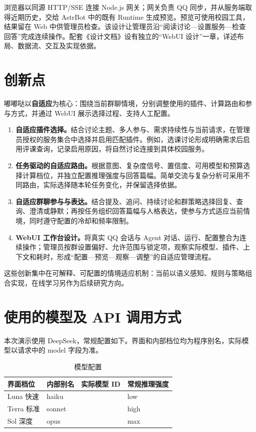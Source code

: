 \documentclass[lang=cn,chinesefont=nofont,11pt,a4paper,bibend=bibtex]{elegantpaper}
\begin{document}
浏览器以同源 HTTP/SSE 连接 Node.js 网关；网关负责 QQ 同步，并从服务端取得近期历史，交给 AstrBot 中的既有 Runtime 生成预览。预览可使用校园工具，结果留在 Web 中供管理员检查。该设计让管理员沿“阅读讨论—设置服务—检查回答”完成连续操作。配套《设计文档》设有独立的“WebUI 设计”一章，详述布局、数据流、交互及实现依据。

\section{创新点}
嘟嘟哒以\textbf{自适应}为核心：围绕当前群聊情境，分别调整使用的插件、计算路由和参与方式，并通过 WebUI 展示选择过程、支持人工配置。

\begin{enumerate}
\item \textbf{自适应插件选择。}结合讨论主题、多人参与、需求持续性与当前请求，在管理员授权的服务集合中选择并启用匹配插件。例如，选课讨论形成明确需求后启用评课查询，记录启用原因，将自然讨论连接到具体校园服务。
\item \textbf{任务驱动的自适应路由。}根据意图、复杂度信号、置信度、可用模型和预算选择计算档位，并独立配置推理强度与回答篇幅。简单交流与复杂分析可采用不同路由，实际选择随本轮任务变化，并保留选择依据。
\item \textbf{自适应群聊参与与表达。}结合提及、追问、持续讨论和群策略选择回复、查询、澄清或静默；再按任务组织回答篇幅与人格表达，使参与方式适应当前情境，同时遵守配置的冷却和频率限制。
\item \textbf{WebUI 工作台设计。}将真实 QQ 会话与 Agent 对话、运行、配置整合为连续操作；管理员按群设置偏好、允许范围与锁定项，观察实际模型、插件、上下文和耗时，形成“配置—预览—观察—调整”的自适应管理流程。
\end{enumerate}

这些创新集中在可解释、可配置的情境适应机制：当前以语义感知、规则与策略组合实现，在线学习另作为后续研究方向。

\clearpage
\section{使用的模型及 API 调用方式}
本次演示使用 DeepSeek，常规配置如下。界面和内部档位均为程序别名，实际模型以请求中的 model 字段为准。

\begin{table}[htbp]\centering
\caption{模型配置}
\begin{tabularx}{\textwidth}{@{}L{27mm}L{21mm}L{45mm}Y@{}}\toprule
界面档位 & 内部别名 & 实际模型 ID & 常规推理强度\\\midrule
Luna 快速 & haiku &  & low\\
Terra 标准 & sonnet &  & high\\
Sol 深度 & opus &  & max\\\bottomrule
\end{tabularx}
\end{table}
\end{document}
